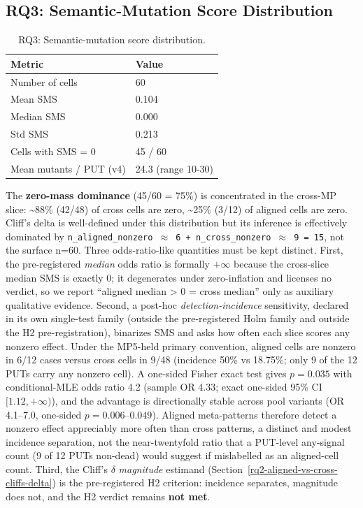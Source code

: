 \documentclass[manuscript,screen,review]{acmart}
\begin{document}
\subsection{RQ3: Semantic-Mutation Score Distribution}\label{rq1-60-cell-distribution}

{%
\begin{longtable}[]{@{}ll@{}}
\caption{RQ3: Semantic-mutation score distribution.}\\
\toprule\noalign{}
Metric & Value \\
\midrule\noalign{}
\endhead
\bottomrule\noalign{}
\endlastfoot
Number of cells & 60 \\
Mean SMS & 0.104 \\
Median SMS & 0.000 \\
Std SMS & 0.213 \\
Cells with SMS = 0 & 45 / 60 \\
Mean mutants / PUT (v4) & 24.3 (range 10-30) \\
\end{longtable}
}

The \textbf{zero-mass dominance} (45/60 = 75\%) is concentrated in the
cross-MP slice: \textasciitilde88\% (42/48) of cross cells are zero,
\textasciitilde25\% (3/12) of aligned cells are zero. Cliff's delta is
well-defined under this distribution but its inference is effectively
dominated by
\texttt{n\_aligned\_nonzero\ $\approx$\ 6\ +\ n\_cross\_nonzero\ $\approx$\ 9\ =\ 15}, not the
surface n=60. Three odds-ratio-like quantities must be kept distinct.
First, the pre-registered \emph{median} odds ratio is formally $+\infty$
because the cross-slice median SMS is exactly 0; it degenerates under
zero-inflation and licenses no verdict, so we report ``aligned median
\textgreater{} 0 = cross median'' only as auxiliary qualitative evidence.
Second, a post-hoc \emph{detection-incidence} sensitivity, declared in
its own single-test family (outside the pre-registered Holm family and
outside the H2 pre-registration), binarizes SMS and asks how often each
slice scores any nonzero effect. Under the MP5-held primary convention,
aligned cells are nonzero in 6/12 cases versus cross cells in 9/48
(incidence 50\% vs 18.75\%; only 9 of the 12 PUTs carry any nonzero
cell). A one-sided Fisher exact test gives $p = 0.035$ with
conditional-MLE odds ratio 4.2 (sample OR 4.33; exact one-sided 95\% CI
$[1.12, +\infty)$), and the advantage is directionally stable across
pool variants (OR 4.1--7.0, one-sided $p = 0.006$--$0.049$). Aligned
meta-patterns therefore detect a nonzero effect appreciably more often
than cross patterns, a distinct and modest incidence separation, not the
near-twentyfold ratio that a PUT-level any-signal count (9 of 12 PUTs
non-dead) would suggest if mislabelled as an aligned-cell count. Third,
the Cliff's $\delta$ \emph{magnitude} estimand
(Section~\ref{rq2-aligned-vs-cross-cliffs-delta}) is the pre-registered
H2 criterion: incidence separates, magnitude does not, and the H2
verdict remains \textbf{not met}.
\end{document}
